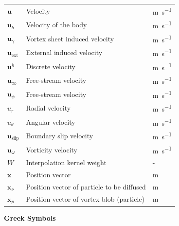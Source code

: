 {\begin{longtable}{p{1.5cm}p{10.5cm}p{1.5cm}}
	$\mathbf{u}$			& Velocity 											& \si{m.s^{-1}}\\
	$\mathbf{u}_b$			& Velocity of the body 								& \si{m.s^{-1}}\\
	$\mathbf{u}_{\gamma}$	& Vortex sheet induced velocity                   	& \si{m.s^{-1}}\\	
	$\mathbf{u}_{\mathrm{ext}}$		& External induced velocity							& \si{m.s^{-1}}\\	
	$\mathbf{u}^h$			& Discrete velocity                               	& \si{m.s^{-1}}\\		
	$\mathbf{u}_{\infty}$	& Free-stream velocity								& \si{m.s^{-1}}\\			
	$\mathbf{u}_{\phi}$		& Free-stream velocity                            	& \si{m.s^{-1}}\\				
	$u_{r}$					& Radial velocity									& \si{m.s^{-1}}\\			
	$u_{\theta}$			& Angular velocity                               	& \si{m.s^{-1}}\\
	$\mathbf{u}_{\mathrm{slip}}$	& Boundary slip velocity					& \si{m.s^{-1}}\\
	$\mathbf{u}_{\omega}$	& Vorticity velocity 								& \si{m.s^{-1}}\\	

	$W$ 					& Interpolation kernel weight 						&-\\		
	$\mathbf{x}$			& Position vector 									& \si{m}\\		
	$\mathbf{x}_{\nu}$		& Position vector of particle to be diffused 		& \si{m}\\			
	$\mathbf{x}_{p}$		& Position vector of vortex blob (particle)			& \si{m}\\				
\end{longtable}}

{\textbf{\textsf{Greek Symbols}}}

